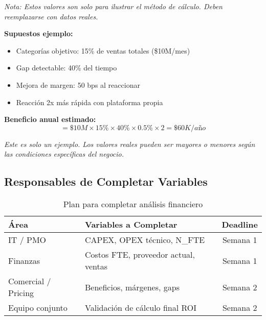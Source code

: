 \documentclass[12pt,a4paper]{article}
\begin{document}
\begin{tcolorbox}[colback=primaryblue!10, colframe=primaryblue, title=\textbf{Ejemplo No Vinculante}]
\textit{Nota: Estos valores son solo para ilustrar el método de cálculo. Deben reemplazarse con datos reales.}

\vspace{0.3cm}
\textbf{Supuestos ejemplo:}
\begin{itemize}[leftmargin=*]
    \item Categorías objetivo: 15\% de ventas totales (\$10M/mes)
    \item Gap detectable: 40\% del tiempo
    \item Mejora de margen: 50 bps al reaccionar
    \item Reacción 2x más rápida con plataforma propia
\end{itemize}

\textbf{Beneficio anual estimado:}
\[
= \$10M \times 15\% \times 40\% \times 0.5\% \times 2 = \$60K/año
\]

\textit{Este es solo un ejemplo. Los valores reales pueden ser mayores o menores según las condiciones específicas del negocio.}
\end{tcolorbox}

\subsection{Responsables de Completar Variables}

\begin{table}[h]
\centering
\begin{tabularx}{\textwidth}{|X|X|c|}
\hline
\rowcolor{lightgray}
\textbf{Área} & \textbf{Variables a Completar} & \textbf{Deadline} \\
\hline
IT / PMO & CAPEX, OPEX técnico, N\_FTE & Semana 1 \\
\hline
Finanzas & Costos FTE, proveedor actual, ventas & Semana 1 \\
\hline
Comercial / Pricing & Beneficios, márgenes, gaps & Semana 2 \\
\hline
Equipo conjunto & Validación de cálculo final ROI & Semana 2 \\
\hline
\end{tabularx}
\caption{Plan para completar análisis financiero}
\end{table}
\end{document}
